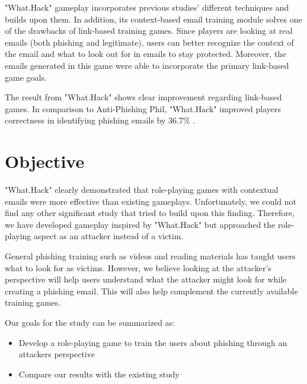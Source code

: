 "What.Hack" gameplay incorporates previous studies' different techniques and builds upon them. In addition, its context-based email training module solves one of the drawbacks of link-based training games. Since players are looking at real emails (both phishing and legitimate), users can better recognize the context of the email and what to look out for in emails to stay protected. Moreover, the emails generated in this game were able to incorporate the primary link-based game goals.

The result from "What.Hack" shows clear improvement regarding link-based games. In comparison to Anti-Phishing Phil, "What.Hack" improved players correctness in identifying phishing emails by 36.7\% \cite{what_hack}.

\section{Objective}
"What.Hack" clearly demonstrated that role-playing games with contextual emails were more effective than existing gameplays. Unfortunately, we could not find any other significant study that tried to build upon this finding. Therefore, we have developed gameplay inspired by "What.Hack" but approached the role-playing aspect as an attacker instead of a victim.

General phishing training such as videos and reading materials has taught users what to look for as victims. However, we believe looking at the attacker's perspective will help users understand what the attacker might look for while creating a phishing email. This will also help complement the currently available training games.

Our goals for the study can be summarized as:

\begin{itemize}
    \setlength\itemsep{-0.6em}
    \item Develop a role-playing game to train the users about phishing through an attackers perspective
    \item Compare our results with the existing study
\end{itemize}
